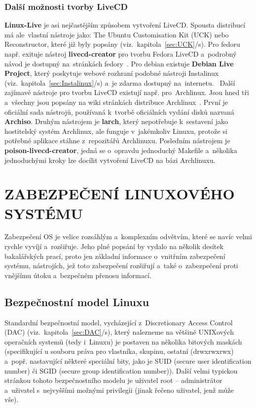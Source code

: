 \documentclass[a4paper,12pt]{article}
\newcommand{\upc}[1]{\uppercase{#1}} %
\newcommand{\odkazNaKapitolu}[1]{(viz.~kapitola~\ref{#1}/s\pageref{#1})}
\renewcommand{\b}[1]{\textbf{#1}} %
\begin{document}
\subsubsection{Další možnosti tvorby LiveCD}
\b{Linux-Live} je asi nejčastějším způsobem vytvoření LiveCD. Spousta distribucí má ale~vlastní nástroje jako: The Ubuntu Customisation Kit (UCK) nebo Reconstructor, které již byly popsány \odkazNaKapitolu{sec:UCK}. Pro fedoru např. exituje nástroj \b{livecd-creator} pro tvorbu Fedora LiveCD a~podrobný návod je dostupný na~stránkách fedory~\cite{FedoraLiveCDproject}. Pro debian existuje \textbf{Debian Live Project}, který poskytuje webové rozhraní podobné nástroji Instalinux \odkazNaKapitolu{sec:Instalinux} a~je zdarma dostupný na~internetu.~\cite{DebianLiveProject}
Další zajímavé nástroje pro tvorbu LiveCD existují např. pro~Archlinux. Jsou hned tři a~všechny jsou popsány na wiki stránkách distribuce Archlinux~\cite{ArchWiki-BuildLiveCD}. První je oficiální sada nástrojů, používaná k~tvorbě oficiálních vydání disků nazvaná \b{Archiso}. Druhým nástrojem je \b{larch}, který nepotřebuje k~sestavení jako hostitelský systém Archlinux, ale funguje v~jakémkoliv Linuxu, protože si potřebné aplikace stáhne z~repozitářů Archlinuxu. Posledním nástrojem je \textbf{poison-livecd-creator}, jedná se o~opravdu jednoduchý Makefile a~několika jednoduchými kroky lze docílit vytvoření LiveCD na bázi Archlinuxu.


\section{\upc{Zabezpečení Linuxového systému}}

Zabezpečení OS je velice rozsáhlým a~komplexním odvětvím, které se navíc velmi rychle vyvíjí a~rozšiřuje. Jeho plné popsání by vydalo na několik desítek bakalářských prací, proto jen základní informace o~vnitřním zabezpečení systému, nástrojích, jež toto zabezpečení rozšiřují a~také o~zabezpečení proti vnějšímu útoku a~bezpečném přenosu informací.

\subsection{Bezpečnostní model Linuxu}
Standardní bezpečnostní model, vycházející z~Discretionary Access Control (DAC) \odkazNaKapitolu{sec:DAC}, který nalezneme na většině UNIXových operačních systemů (tedy i~Linuxu) je postaven na několika bitových maskách (specifikující u souboru práva pro vlastníka, skupinu, ostatní (drwxrwxrwx) a~popř. nastavující některé speciální bity, jako je SUID (secure user identification number) či SGID (secure group identification number)). Další velmi typickou stránkou tohoto bezpečnostního modelu je uživatel root – administrátor a~uživatel s~nejvyššími možnými privilegii (jinak řečeno uživatel, jenž může vše).~\cite{LINUXZONEGrsecurity}\\
\end{document}
